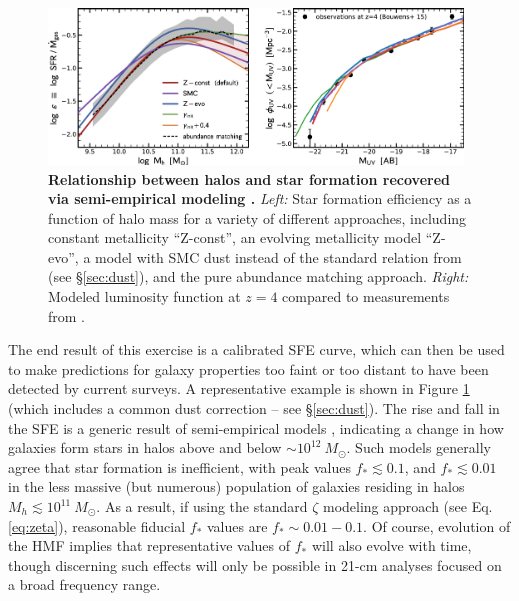 \begin{figure}[]
\begin{center}
\includegraphics[width=0.98\textwidth]{Mirocha/tacchella2018_fig2.pdf}
\end{center}
\caption{{\bf Relationship between halos and star formation recovered via semi-empirical modeling \cite{Tacchella2018}.} \textit{Left:} Star formation efficiency as a function of halo mass for a variety of different approaches, including constant metallicity ``Z-const'', an evolving metallicity model ``Z-evo'', a model with SMC dust instead of the standard relation from \cite{Meurer1999} (see \S\ref{sec:dust}), and the pure abundance matching approach. \textit{Right:} Modeled luminosity function at $z=4$ compared to measurements from \cite{Bouwens2015}.}
\label{fig:sfe_lf}
\end{figure}

The end result of this exercise is a calibrated SFE curve, which can then be used to make predictions for galaxy properties too faint or too distant to have been detected by current surveys. A representative example \cite{Tacchella2018} is shown in Figure \ref{fig:sfe_lf} (which includes a common dust correction -- see \S\ref{sec:dust}). The rise and fall in the SFE is a generic result of semi-empirical models \cite{Mason2015,Sun2016,Mashian2016,Tacchella2018,Behroozi2019}, indicating a change in how galaxies form stars in halos above and below $\sim 10^{12} \ M_{\odot}$. Such models generally agree that star formation is inefficient, with peak values $f_{\ast} \lesssim 0.1$, and $f_{\ast} \lesssim 0.01$ in the less massive (but numerous) population of galaxies residing in halos $M_h \lesssim 10^{11} \ M_{\odot}$. As a result, if using the standard $\zeta$ modeling approach (see Eq. \ref{eq:zeta}), reasonable fiducial $f_{\ast}$ values are $f_{\ast} \sim 0.01-0.1$. Of course, evolution of the HMF implies that representative values of $f_{\ast}$ will also evolve with time, though discerning such effects will only be possible in 21-cm analyses focused on a broad frequency range. 

